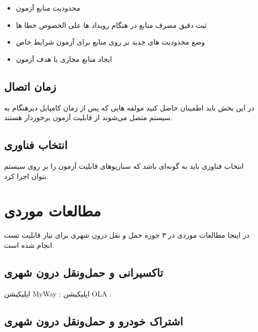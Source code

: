 \begin{itemize}
\item
محدودیت منابع آزمون
\item
ثبت دقیق مصرف منابع در هنگام رویداد ها علی الخصوص خطا ها
\item
وضع محدودیت های جدید بر روی منابع برای آزمون شرایط خاص
\item
ایجاد منابع مجازی با هدف آزمون
\end{itemize}
\subsection{زمان اتصال}
در این بخش باید اطمینان حاصل کنید مولفه هایی که پس از زمان کامپایل دیرهنگام به سیستم متصل می‌شوند از قابلیت آزمون برخوردار هستند.
\subsection{انتخاب فناوری}
انتخاب فناوری باید به گونه‌ای باشد که سناریو‌های قابلیت آزمون را بر روی سیستم بتوان اجرا کرد.



\section{مطالعات موردی}

در اینجا مطالعات موردی در ۳ حوزه حمل و نقل درون شهری برای نیاز قابلیت تست انجام شده است. 
\subsection{تاکسیرانی و حمل‌و‌نقل درون شهری}

اپلیکیشن MyWay :
اپلیکیشن OLA : 
\subsection{اشتراک خودرو و حمل‌و‌نقل درون شهری}

